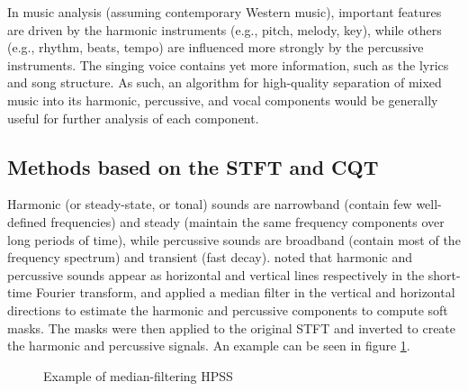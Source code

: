 \documentclass[letter,12pt]{article}
\begin{document}
In music analysis (assuming contemporary Western music), important features are driven by the harmonic instruments (e.g., pitch, melody, key), while others (e.g., rhythm, beats, tempo) are influenced more strongly by the percussive instruments. The singing voice contains yet more information, such as the lyrics and song structure. As such, an algorithm for high-quality separation of mixed music into its harmonic, percussive, and vocal components would be generally useful for further analysis of each component.

\subsection{Methods based on the STFT and CQT}

Harmonic (or steady-state, or tonal) sounds are narrowband (contain few well-defined frequencies) and steady (maintain the same frequency components over long periods of time), while percussive sounds  are broadband (contain most of the frequency spectrum) and transient (fast decay). \citet{fitzgerald1} noted that harmonic and percussive sounds appear as horizontal and vertical lines respectively in the short-time Fourier transform, and applied a median filter in the vertical and horizontal directions to estimate the harmonic and percussive components to compute soft masks. The masks were then applied to the original STFT and inverted to create the harmonic and percussive signals. An example can be seen in figure \ref{fig:fitz1}.

\begin{figure}[ht]
	\centering
	\caption{Example of median-filtering HPSS}
	\label{fig:fitz1}
\end{figure}
\end{document}
